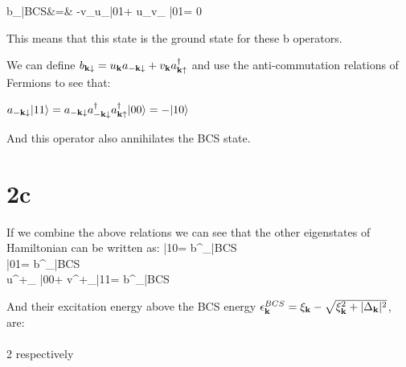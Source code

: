 \documentclass[a4paper,11pt]{article}
\begin{document}
\bea
b_{\vk\uparrow}|BCS\rangle &=& -v_{\vk}u_{\vk}|01\rangle + u_{\vk}v_{\vk} |01\rangle = 0
\eea

This means that this state is the ground state for these b operators. 

We can define $b_{{\bf k}\downarrow} = u_{{\bf k}}a_{-{\bf k}\downarrow} + v_{{\bf k}}a^\dagger_{{\bf k}\uparrow}$ and use the anti-commutation relations of Fermions to see that:

$a_{-{\bf k}\downarrow}|11\rangle = a_{-{\bf k}\downarrow}a^\dagger_{-{\bf k}\downarrow}a^\dagger_{{\bf k}\uparrow}|00\rangle =-|10\rangle $

And this operator also annihilates the BCS state.

\section*{2c}
If we combine the above relations we can see that the other eigenstates of Hamiltonian can be written as:
\bea
|10\rangle = b^\dagger_{\vk\uparrow}|BCS\rangle	\\
|01\rangle = b^\dagger_{\vk\downarrow}|BCS\rangle	\\
u^{+}_{\vk} |00\rangle + v^{+}_{\vk}|11\rangle = b^\dagger_{\vk\uparrow}|BCS\rangle
\eea

And their excitation energy above the BCS energy $\epsilon^{BCS}_{{\bf k}} = \xi_{{\bf k}} - \sqrt{\xi_{{\bf k}}^2 + |\Delta_{{\bf k}}|^2}$, are:
\bea
{}	\\
	\\
2
\eea
respectively
\end{document}
